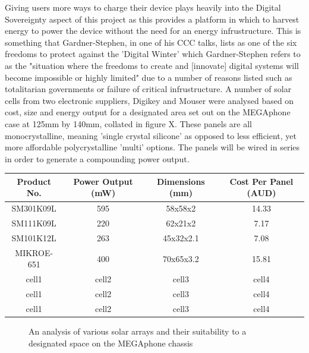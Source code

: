 Giving users more ways to charge their device plays heavily into the Digital Sovereignty aspect of this project as this provides a platform in which to harvest energy to power the device without the need for an energy infrustructure.
This is something that Gardner-Stephen, in one of his CCC talks, lists as one of the six freedoms to protect against the 'Digital Winter' which Gardner-Stephen refers to as the "situation where the freedoms to create and [innovate] digital systems will become impossible or highly limited" due to a number of reasons listed such as totalitarian governments or failure of critical infrustructure\cite{freedoms}.
A number of solar cells from two electronic suppliers, Digikey and Mouser were analysed based on cost, size and energy output for a designated area set out on the MEGAphone case at 125mm by 140mm, collated in figure X. %
These panels are all monocrystalline, meaning 'single crystal silicone' as opposed to less efficient, yet more affordable polycrystalline 'multi' options.
The panels will be wired in series in order to generate a compounding power output.

\begin{center}
    \begin{tabular}{ |c|c|c|c| }
    \hline
    Product No. & Power Output (mW) & Dimensions (mm) & Cost Per Panel (AUD) \\
    \hline
    SM301K09L & 595 & 58x58x2 & 14.33 \\
    \hline
    SM111K09L & 220 & 62x21x2 & 7.17 \\ 
    \hline
    SM101K12L & 263 & 45x32x2.1 & 7.08 \\
    \hline
    MIKROE-651 & 400 & 70x65x3.2 & 15.81 \\
    \hline
    cell1 & cell2 & cell3 & cell4 \\
    \hline
    cell1 & cell2 & cell3 & cell4 \\
    \hline
    cell1 & cell2 & cell3 & cell4 \\
    \hline
    \end{tabular}
\end{center}

\begin{figure}
    \caption{An analysis of various solar arrays and their suitability to a designated space on the MEGAphone chassis}
    \label{fig:DesignPrinciples}
\end{figure}


